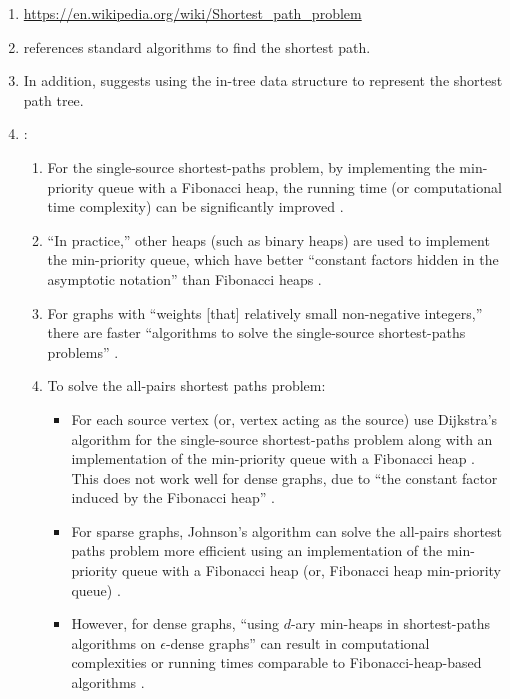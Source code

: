 \begin{enumerate}
\begin{enumerate}
\begin{enumerate}
		\item \url{https://en.wikipedia.org/wiki/Shortest_path_problem}
		\item \cite[\S55.2]{Goldman2008} references standard algorithms to find the shortest path.
		\item In addition, \cite[\S55.3]{Goldman2008} suggests using the in-tree data structure to represent the shortest path tree.
		\item \cite[\S24--\S25]{Cormen2009}: \vspace{-0.1cm}
			\begin{enumerate} \itemsep -1pt
			\item For the single-source shortest-paths problem, by implementing the min-priority queue with a Fibonacci heap, the running time (or computational time complexity) can be significantly improved \cite[\S24.3, pp. 662]{Cormen2009} \cite[\S6, pp. 101]{Cormen2013}.
			\item ``In practice,'' other heaps (such as binary heaps) are used to implement the min-priority queue, which have better ``constant factors hidden in the asymptotic notation'' than Fibonacci heaps \cite[\S6, pp. 101]{Cormen2013}.
			\item For graphs with ``weights [that] relatively small non-negative integers,'' there are faster ``algorithms to solve the single-source shortest-paths problems'' \cite[\S24.Chapter notes, pp. 682]{Cormen2009}.
			\item To solve the all-pairs shortest paths problem: \vspace{-0.1cm}
				\begin{itemize} \itemsep -1pt
				\item For each source vertex (or, vertex acting as the source) use Dijkstra's algorithm for the single-source shortest-paths problem along with an implementation of the min-priority queue with a Fibonacci heap \cite[\S25, pp. 684]{Cormen2009} \cite[\S6, pp. 101, 107]{Cormen2013}. This does not work well for dense graphs, due to ``the constant factor induced by the Fibonacci heap'' \cite[\S6, pp. 107]{Cormen2013}.
				\item For sparse graphs, Johnson's algorithm can solve the all-pairs shortest paths problem more efficient using an implementation of the min-priority queue with a Fibonacci heap (or, Fibonacci heap min-priority queue) \cite[\S25.3, pp. 700]{Cormen2009}.
				\item However, for dense graphs, ``using $d$-ary min-heaps in shortest-paths algorithms on $\epsilon$-dense graphs'' can result in computational complexities or running times comparable to Fibonacci-heap-based algorithms \cite[\S25.Problems, pp. 706]{Cormen2009}.

\end{itemize}
\end{enumerate}
\end{enumerate}
\end{enumerate}
\end{enumerate}
